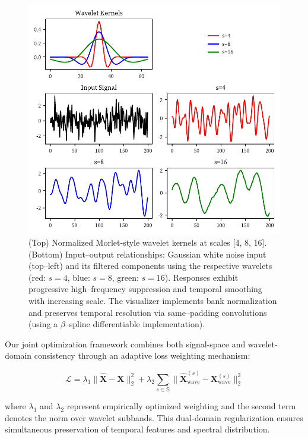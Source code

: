 \documentclass[conference]{IEEEtran}
\begin{document}
\begin{figure}[tb]
    \centering
    \includegraphics[width=\linewidth]{wavelet-transform.pdf}
    \caption{(Top) Normalized Morlet-style wavelet kernels at scales [4, 8, 16]. (Bottom) Input–output relationships: Gaussian white noise input (top–left) and its filtered components using the respective wavelets (red: $s=4$, blue: $s=8$, green: $s=16$). Responses exhibit progressive high–frequency suppression and temporal smoothing with increasing scale. The visualizer implements bank normalization and preserves temporal resolution via same–padding convolutions (using a $\beta$–spline differentiable implementation).}

    \label{fig:wavelet-transform}
\end{figure}

Our joint optimization framework combines both signal-space and wavelet-domain consistency through an adaptive loss weighting mechanism:

\begin{equation}
    \mathcal{L} = \lambda_1\|\mathbf{\hat{X}} - \mathbf{X}\|_{2}^2 + \lambda_2\sum_{s\in\mathbb{S}} \|\mathbf{\hat{X}}_{\text{wave}}^{(s)} - \mathbf{X}_{\text{wave}}^{(s)}\|_{2}^2
\end{equation}

where $\lambda_1$ and $\lambda_2$ represent empirically optimized weighting and the second term denotes the norm over wavelet subbands. This dual-domain regularization ensures simultaneous preservation of  temporal features and spectral distribution.
\end{document}
